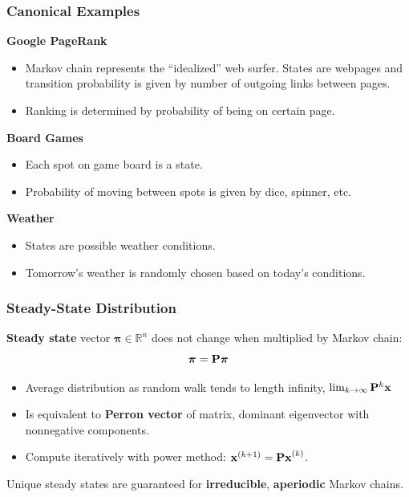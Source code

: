 \documentclass{beamer}
\begin{document}
\begin{frame}
\frametitle{Canonical Examples}

\textbf{Google PageRank}
\begin{itemize}
\item Markov chain represents the ``idealized'' web surfer.  States are webpages and transition probability is given by number of outgoing links between pages.
\item Ranking is determined by probability of being on certain page.
\end{itemize}

\textbf{Board Games}
\begin{itemize}
\item Each spot on game board is a state.
\item Probability of moving between spots is given by dice, spinner, etc.
\end{itemize}

\textbf{Weather}
\begin{itemize}
\item States are possible weather conditions.
\item Tomorrow's weather is randomly chosen based on today's conditions.
\end{itemize}

\end{frame}


\begin{frame}
\frametitle{Steady-State Distribution}

\begin{block}{}
\textbf{Steady state} vector $\boldsymbol{\pi} \in \mathbb{R}^n$ does not change when multiplied by Markov chain:
\[ \boldsymbol{\pi} = {\bf P} \boldsymbol{\pi} \]
\end{block}

\begin{itemize}
\item Average distribution as random walk tends to length infinity, $\lim_{k\to\infty} {\bf P}^k{\bf x}$
\item Is equivalent to \textbf{Perron vector} of matrix, dominant eigenvector with nonnegative components.
\item Compute iteratively with power method: ${\bf x}^{(k+1) } = {\bf Px}^{(k)}$.
\end{itemize}

\begin{block}{}
Unique steady states are guaranteed for \textbf{irreducible}, \textbf{aperiodic} Markov chains.
\end{block}

\end{frame}
\end{document}
